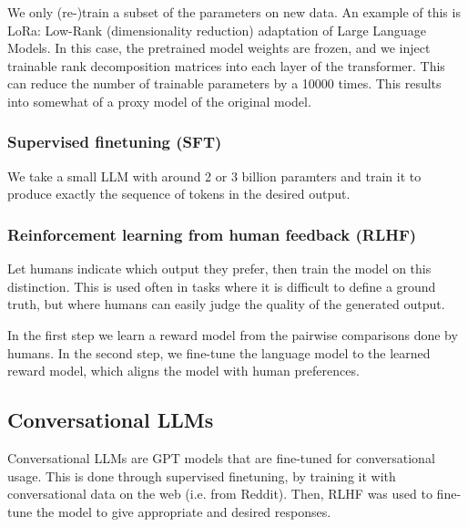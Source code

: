 We only (re-)train a subset of the parameters on new data. An example of this is
LoRa: Low-Rank (dimensionality reduction) adaptation of Large
Language Models. In this case, the pretrained
model weights are frozen, and we inject trainable rank decomposition matrices
into each layer of the transformer. This can reduce the number of
trainable parameters
by a 10000 times. This results into somewhat of a proxy model of the
original model.

\subsubsection{Supervised finetuning (SFT)}

We take a small LLM with around 2 or 3 billion paramters and train
it to produce exactly the sequence of tokens in the desired output.

\subsubsection{Reinforcement learning from human feedback (RLHF)}

Let humans indicate which output they prefer, then train the model
on this distinction. This is used often in tasks where it is difficult to define
a ground truth, but where humans can easily judge the quality of the
generated output.

In the first step we learn a reward model from the pairwise comparisons done
by humans. In the second step, we fine-tune the language model to the
learned reward
model, which aligns the model with human preferences.

\subsection{Conversational LLMs}

Conversational LLMs are GPT models that are fine-tuned for conversational
usage. This is done through supervised finetuning, by training it
with conversational
data on the web (i.e. from Reddit). Then, RLHF was used to fine-tune
the model to give
appropriate and desired responses.
